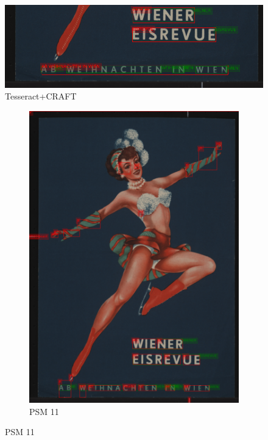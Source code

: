 \begin{figure}[hbtp!]
    \centering
    \includegraphics[scale=0.36]{obrazky/plakaty/result_carfttesseract_vienna1_split-21.png}
    \caption{Tesseract+CRAFT}
    \label{Im2:ex:Craft}
\end{figure}

\begin{figure}[hbtp!]
    \begin{subfigure}{\textwidth}
        \centering
        \includegraphics[scale=0.36]{obrazky/plakaty/result_tesseract_vienna1_nosplit_psm11-21.png}
        \caption{PSM 11}
        \label{Im2:ex:tess11}
    \end{subfigure}


\end{figure}
